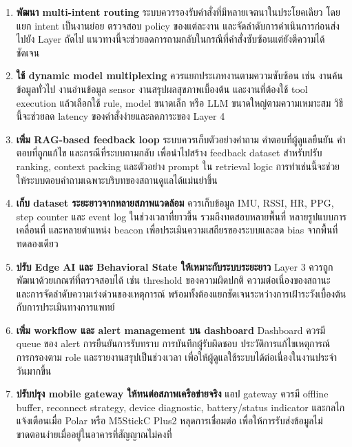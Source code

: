 \begin{enumerate}
    \item \textbf{พัฒนา multi-intent routing} ระบบควรรองรับคำสั่งที่มีหลายเจตนาในประโยคเดียว โดยแยก intent เป็นงานย่อย ตรวจสอบ policy ของแต่ละงาน และจัดลำดับการดำเนินการก่อนส่งไปยัง Layer ถัดไป แนวทางนี้จะช่วยลดการถามกลับในกรณีที่คำสั่งซับซ้อนแต่ยังตีความได้ชัดเจน

    \item \textbf{ใช้ dynamic model multiplexing} ควรแยกประเภทงานตามความซับซ้อน เช่น งานค้นข้อมูลทั่วไป งานอ่านข้อมูล sensor งานสรุปผลสุขภาพเบื้องต้น และงานที่ต้องใช้ tool execution แล้วเลือกใช้ rule, model ขนาดเล็ก หรือ LLM ขนาดใหญ่ตามความเหมาะสม วิธีนี้จะช่วยลด latency ของคำสั่งง่ายและลดภาระของ Layer 4

    \item \textbf{เพิ่ม RAG-based feedback loop} ระบบควรเก็บตัวอย่างคำถาม คำตอบที่ผู้ดูแลยืนยัน คำตอบที่ถูกแก้ไข และกรณีที่ระบบถามกลับ เพื่อนำไปสร้าง feedback dataset สำหรับปรับ ranking, context packing และตัวอย่าง prompt ใน retrieval logic การทำเช่นนี้จะช่วยให้ระบบตอบคำถามเฉพาะบริบทของสถานดูแลได้แม่นยำขึ้น

    \item \textbf{เก็บ dataset ระยะยาวจากหลายสภาพแวดล้อม} ควรเก็บข้อมูล IMU, RSSI, HR, PPG, step counter และ event log ในช่วงเวลาที่ยาวขึ้น รวมถึงทดสอบหลายพื้นที่ หลายรูปแบบการเคลื่อนที่ และหลายตำแหน่ง beacon เพื่อประเมินความเสถียรของระบบและลด bias จากพื้นที่ทดลองเดียว

    \item \textbf{ปรับ Edge AI และ Behavioral State ให้เหมาะกับระบบระยะยาว} Layer 3 ควรถูกพัฒนาด้วยเกณฑ์ที่ตรวจสอบได้ เช่น threshold ของความผิดปกติ ความต่อเนื่องของสถานะ และการจัดลำดับความเร่งด่วนของเหตุการณ์ พร้อมทั้งต้องแยกชัดเจนระหว่างการเฝ้าระวังเบื้องต้นกับการประเมินทางการแพทย์

    \item \textbf{เพิ่ม workflow และ alert management บน dashboard} Dashboard ควรมี queue ของ alert การยืนยันการรับทราบ การบันทึกผู้รับผิดชอบ ประวัติการแก้ไขเหตุการณ์ การกรองตาม role และรายงานสรุปเป็นช่วงเวลา เพื่อให้ผู้ดูแลใช้ระบบได้ต่อเนื่องในงานประจำวันมากขึ้น

    \item \textbf{ปรับปรุง mobile gateway ให้ทนต่อสภาพเครือข่ายจริง} แอป gateway ควรมี offline buffer, reconnect strategy, device diagnostic, battery/status indicator และกลไกแจ้งเตือนเมื่อ Polar หรือ M5StickC Plus2 หลุดการเชื่อมต่อ เพื่อให้การรับส่งข้อมูลไม่ขาดตอนง่ายเมื่ออยู่ในอาคารที่สัญญาณไม่คงที่


\end{enumerate}
